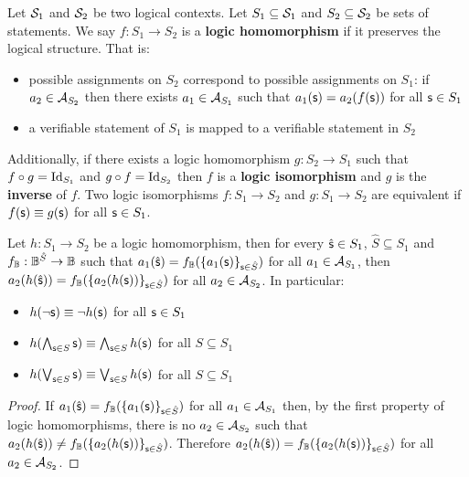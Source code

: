 \documentclass[11pt,letterpaper,fleqn]{memoir} %
\begin{document}
\begin{mathSection}
	\begin{defn}
		Let $\logCtx_1$ and $\logCtx_2$ be two logical contexts. Let $S_1 \subseteq \logCtx_1$ and $S_2 \subseteq \logCtx_2$ be sets of statements. We say $f : S_1 \to S_2$ is a \textbf{logic homomorphism} if it preserves the logical structure. That is:
		\begin{itemize}
			\item possible assignments on $S_2$ correspond to possible assignments on $S_1$: if $a_2 \in \pAss[S_2]$ then there exists $a_1 \in \pAss[S_1]$ such that $a_1(\stmt) = a_2(f(\stmt))$ for all $\stmt \in S_1$
			\item a verifiable statement of $S_1$ is mapped to a verifiable statement in $S_2$
		\end{itemize}
		Additionally, if there exists a logic homomorphism $g : S_2 \to S_1$ such that $f \circ g = \Id_{S_1}$ and $g \circ f = \Id_{S_2}$ then $f$ is a \textbf{logic isomorphism} and $g$ is the \textbf{inverse} of $f$. Two logic isomorphisms $f : S_1 \to S_2$ and $g : S_1 \to S_2$ are equivalent if $f(\stmt)\equiv g(\stmt)$ for all $\stmt \in S_1$.
	\end{defn}

\begin{coro}\label{3_coro_logic_homomorphism_preserves_boolean}
	Let $h : S_1 \to S_2$ be a logic homomorphism, then for every $\hat{\stmt} \in S_1$, $\hat{S} \subseteq S_1$ and $f_\Bool : \Bool^{\hat{S}} \to \Bool$ such that $a_1(\hat{\stmt}) = f_\Bool(\{ a_1(\stmt) \}_{\stmt \in \hat{S}})$ for all $a_1 \in \pAss[S_1]$, then $a_2(h(\hat{\stmt})) = f_\Bool(\{ a_2(h(\stmt)) \}_{\stmt \in \hat{S}})$ for all $a_2 \in \pAss[S_2]$. In particular:
	\begin{itemize}
		\item $h(\NOT \stmt) \equiv \NOT h(\stmt)$ for all $\stmt \in S_1$
		\item $h(\bigAND_{\stmt \in S} \stmt) \equiv \bigAND_{\stmt \in S} h(\stmt)$ for all $S \subseteq S_1$
		\item $h(\bigOR_{\stmt \in S} \stmt) \equiv \bigOR_{\stmt \in S} h(\stmt)$ for all $S \subseteq S_1$
	\end{itemize}
\end{coro}

\begin{proof}
	If $a_1(\hat{\stmt}) = f_\Bool(\{ a_1(\stmt) \}_{\stmt \in \hat{S}})$ for all $a_1 \in \pAss[S_1]$ then, by the first property of logic homomorphisms, there is no $a_2 \in \pAss[S_2]$ such that $a_2(h(\hat{\stmt})) \neq f_\Bool(\{ a_2(h(\stmt)) \}_{\stmt \in \hat{S}})$. Therefore $a_2(h(\hat{\stmt})) = f_\Bool(\{ a_2(h(\stmt)) \}_{\stmt \in \hat{S}})$ for all $a_2 \in \pAss[S_2]$.
	

\end{proof}
\end{mathSection}
\end{document}
